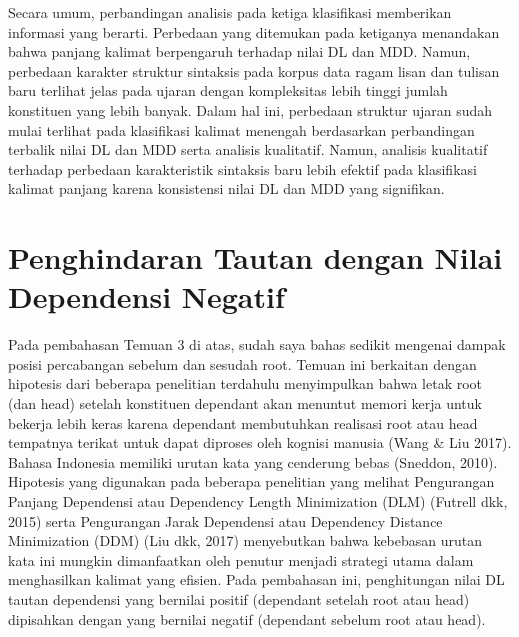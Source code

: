 Secara umum, perbandingan analisis pada ketiga klasifikasi memberikan informasi yang berarti. Perbedaan yang ditemukan pada ketiganya menandakan bahwa panjang kalimat berpengaruh terhadap nilai DL dan MDD. Namun, perbedaan karakter struktur sintaksis pada korpus data ragam lisan dan tulisan baru terlihat jelas pada ujaran dengan kompleksitas lebih tinggi jumlah konstituen yang lebih banyak. Dalam hal ini, perbedaan struktur ujaran sudah mulai terlihat pada klasifikasi kalimat menengah berdasarkan perbandingan terbalik nilai DL dan MDD serta analisis kualitatif. Namun, analisis kualitatif terhadap perbedaan karakteristik sintaksis baru lebih efektif pada klasifikasi kalimat panjang karena konsistensi nilai DL dan MDD yang signifikan.

\section{Penghindaran Tautan dengan Nilai Dependensi Negatif}
Pada pembahasan Temuan 3 di atas, sudah saya bahas sedikit mengenai dampak posisi percabangan sebelum dan sesudah root. Temuan ini berkaitan dengan hipotesis dari beberapa penelitian terdahulu menyimpulkan bahwa letak root (dan head) setelah konstituen dependant akan menuntut memori kerja untuk bekerja lebih keras karena dependant membutuhkan realisasi root atau head tempatnya terikat untuk dapat diproses oleh kognisi manusia (Wang & Liu 2017). Bahasa Indonesia memiliki urutan kata yang cenderung bebas (Sneddon, 2010). Hipotesis yang digunakan pada beberapa penelitian yang melihat Pengurangan Panjang Dependensi atau Dependency Length Minimization (DLM) (Futrell dkk, 2015) serta Pengurangan Jarak Dependensi atau Dependency Distance Minimization (DDM) (Liu dkk, 2017) menyebutkan bahwa kebebasan urutan kata ini mungkin dimanfaatkan oleh penutur menjadi strategi utama dalam menghasilkan kalimat yang efisien. Pada pembahasan ini, penghitungan nilai DL tautan dependensi yang bernilai positif (dependant setelah root atau head) dipisahkan dengan yang bernilai negatif (dependant sebelum root atau head). 

